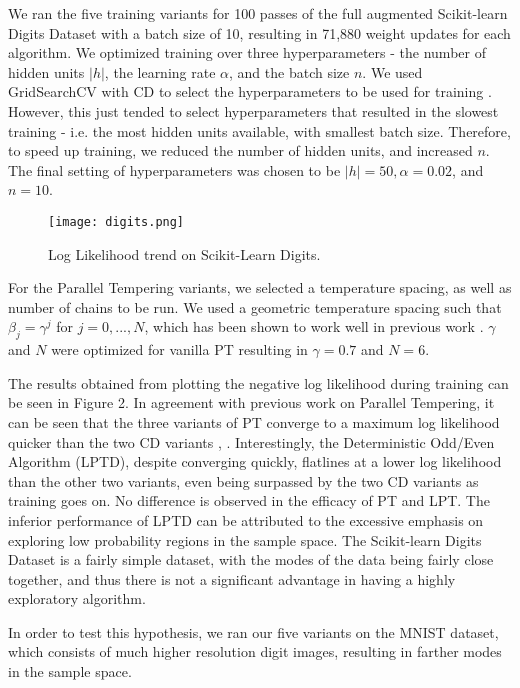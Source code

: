 We ran the five training variants for 100 passes of the full augmented Scikit-learn Digits Dataset with a batch size of 10, resulting in 71,880 weight updates for each algorithm. We optimized training over three hyperparameters - the number of hidden units $|h|$, the learning rate $\alpha$, and the batch size $n$. We used GridSearchCV with CD to select the hyperparameters to be used for training \cite{pedregosa2011scikit}. However, this just tended to select hyperparameters that resulted in the slowest training - i.e. the most hidden units available, with smallest batch size. Therefore, to speed up training, we reduced the number of hidden units, and increased $n$. The final setting of hyperparameters was chosen to be $|h|=50,  \alpha = 0.02$, and $n=10$.

\begin{figure}[ht!]
	\centering
	\texttt{[image: digits.png]}
\caption{Log Likelihood trend on Scikit-Learn Digits.}
\end{figure}

For the Parallel Tempering variants, we selected a temperature spacing, as well as number of chains to be run. We used a geometric temperature spacing such that $\beta_j = \gamma^j$  for $j = 0, ..., N$, which has been shown to work well in previous work \cite{kofke2002acceptance}. $\gamma$ and $N$ were optimized for vanilla PT resulting in $\gamma = 0.7$ and $N=6$.

The results obtained from plotting the negative log likelihood during training can be seen in Figure 2. In agreement with previous work on Parallel Tempering, it can be seen that the three variants of PT converge to a maximum log likelihood quicker than the two CD variants \cite{desjardins2010tempered}, \cite{fischer2014training}. Interestingly, the Deterministic Odd/Even Algorithm (LPTD), despite converging quickly, flatlines at a lower log likelihood than the other two variants, even being surpassed by the two CD variants as training goes on. No difference is observed in the efficacy of PT and LPT. The inferior performance of LPTD can be attributed to the excessive emphasis on exploring low probability regions in the sample space. The Scikit-learn Digits Dataset is a fairly simple dataset, with the modes of the data being fairly close together, and thus there is not a significant advantage in having a highly exploratory algorithm.

In order to test this hypothesis, we ran our five variants on the MNIST dataset, which consists of much higher resolution digit images, resulting in farther modes in the sample space.

